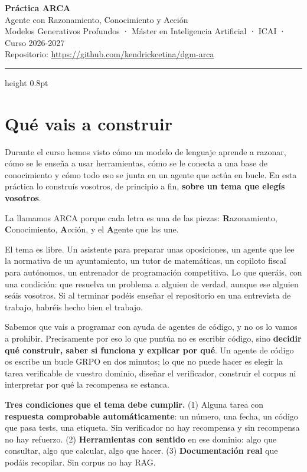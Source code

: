 \documentclass[11pt,a4paper]{article}
\begin{document}
\begin{center}
  {\Large\bfseries\color{arcablue} Práctica ARCA}\\[0.6ex]
  {\large Agente con Razonamiento, Conocimiento y Acción}\\[1.2ex]
  {\small Modelos Generativos Profundos · Máster en Inteligencia Artificial · ICAI · Curso 2026-2027}\\[0.8ex]
  {\small Repositorio: \url{https://github.com/kendrickcetina/dgm-arca}}
\end{center}

\vspace{0.6ex}
{\color{arcarule}\hrule height 0.8pt}
\vspace{1.2ex}

\section{Qué vais a construir}

Durante el curso hemos visto cómo un modelo de lenguaje aprende a razonar, cómo se le enseña
a usar herramientas, cómo se le conecta a una base de conocimiento y cómo todo eso se junta
en un agente que actúa en bucle. En esta práctica lo construís vosotros, de principio a fin,
\textbf{sobre un tema que elegís vosotros}.

La llamamos ARCA porque cada letra es una de las piezas: \textbf{R}azonamiento,
\textbf{C}onocimiento, \textbf{A}cción, y el \textbf{A}gente que las une.

El tema es libre. Un asistente para preparar unas oposiciones, un agente que lee la normativa
de un ayuntamiento, un tutor de matemáticas, un copiloto fiscal para autónomos, un entrenador
de programación competitiva. Lo que queráis, con una condición: que resuelva un problema a
alguien de verdad, aunque ese alguien seáis vosotros. Si al terminar podéis enseñar el
repositorio en una entrevista de trabajo, habréis hecho bien el trabajo.

Sabemos que vais a programar con ayuda de agentes de código, y no os lo vamos a prohibir.
Precisamente por eso lo que puntúa no es escribir código, sino \textbf{decidir qué construir,
saber si funciona y explicar por qué}. Un agente de código os escribe un bucle GRPO en dos
minutos; lo que no puede hacer es elegir la tarea verificable de vuestro dominio, diseñar el
verificador, construir el corpus ni interpretar por qué la recompensa se estanca.

\begin{nota}
\textbf{Tres condiciones que el tema debe cumplir.} (1) Alguna tarea con \textbf{respuesta
comprobable automáticamente}: un número, una fecha, un código que pasa tests, una etiqueta.
Sin verificador no hay recompensa y sin recompensa no hay refuerzo. (2) \textbf{Herramientas
con sentido} en ese dominio: algo que consultar, algo que calcular, algo que hacer.
(3) \textbf{Documentación real} que podáis recopilar. Sin corpus no hay RAG.
\end{nota}
\end{document}
